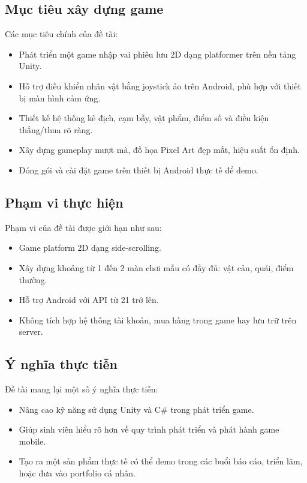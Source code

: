 \documentclass[a4paper,12pt]{article}
\begin{document}
\subsection{Mục tiêu xây dựng game}

Các mục tiêu chính của đề tài:
\begin{itemize}
    \item Phát triển một game nhập vai phiêu lưu 2D dạng platformer trên nền tảng Unity.
    \item Hỗ trợ điều khiển nhân vật bằng joystick ảo trên Android, phù hợp với thiết bị màn hình cảm ứng.
    \item Thiết kế hệ thống kẻ địch, cạm bẫy, vật phẩm, điểm số và điều kiện thắng/thua rõ ràng.
    \item Xây dựng gameplay mượt mà, đồ họa Pixel Art đẹp mắt, hiệu suất ổn định.
    \item Đóng gói và cài đặt game trên thiết bị Android thực tế để demo.
\end{itemize}

\subsection{Phạm vi thực hiện}

Phạm vi của đề tài được giới hạn như sau:
\begin{itemize}
    \item Game platform 2D dạng side-scrolling.
    \item Xây dựng khoảng từ 1 đến 2 màn chơi mẫu có đầy đủ: vật cản, quái, điểm thưởng.
    \item Hỗ trợ Android với API từ 21 trở lên.
    \item Không tích hợp hệ thống tài khoản, mua hàng trong game hay lưu trữ trên server.
\end{itemize}

\subsection{Ý nghĩa thực tiễn}

Đề tài mang lại một số ý nghĩa thực tiễn:
\begin{itemize}
    \item Nâng cao kỹ năng sử dụng Unity và C\# trong phát triển game.
    \item Giúp sinh viên hiểu rõ hơn về quy trình phát triển và phát hành game mobile.
    \item Tạo ra một sản phẩm thực tế có thể demo trong các buổi báo cáo, triển lãm, hoặc đưa vào portfolio cá nhân.
\end{itemize}
\end{document}
